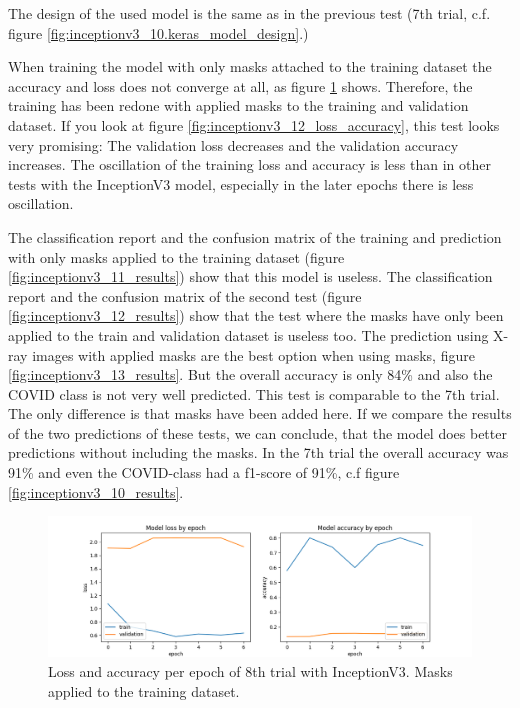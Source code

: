 \documentclass{article}
\begin{document}
The design of the used model is the same as in the previous test (7th trial, c.f. figure \ref{fig:inceptionv3_10.keras_model_design}.)

When training the model with only masks attached to the training dataset the accuracy and loss does not converge at all, as figure \ref{fig:inceptionv3_11_loss_accuracy} shows. Therefore, the training has been redone with applied masks to the training and validation dataset. If you look at figure \ref{fig:inceptionv3_12_loss_accuracy}, this test looks very promising: The validation loss decreases and the validation accuracy increases. The oscillation of the training loss and accuracy is less than in other tests with the InceptionV3 model, especially in the later epochs there is less oscillation. 

The classification report and the confusion matrix of the training and prediction with only masks applied to the training dataset (figure \ref{fig:inceptionv3_11_results}) show that this model is useless. The classification report and the confusion matrix of the second test (figure \ref{fig:inceptionv3_12_results}) show that the test where the masks have only been applied to the train and validation dataset is useless too. 
The prediction using X-ray images with applied masks are the best option when using masks, figure \ref{fig:inceptionv3_13_results}. But the overall accuracy is only 84\% and also the COVID class is not very well predicted. This test is comparable to the 7th trial. The only difference is that masks have been added here. If we compare the results of the two predictions of these tests, we can conclude, that the model does better predictions without including the masks. In the 7th trial the overall accuracy was 91\% and even the COVID-class had a f1-score of 91\%, c.f figure \ref{fig:inceptionv3_10_results}.

    
\begin{figure}%
    \centering
    \includegraphics[width=1.0\linewidth]{inceptionv3_11_loss_accuracy.png}
    \caption{Loss and accuracy per epoch of 8th trial with InceptionV3. Masks applied to the training dataset.}
    \label{fig:inceptionv3_11_loss_accuracy}
\end{figure}
\end{document}
